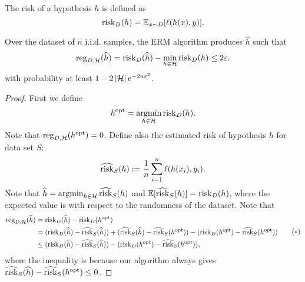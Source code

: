 \documentclass[a4paper]{article}
\begin{document}
\begin{defi}[Risk]
  The risk of a hypothesis $h$ is defined as
  \[
  \operatorname{risk}_D (h) = \mathbb{E}_{x \sim D} [ \ell(h(x), y) ].
  \]
\end{defi}

\begin{thm}
  Over the dataset of $n$ i.i.d. samples, the ERM algorithm
  produces $\hat{h}$ such that
  \[
  \operatorname{reg}_{D, \mathcal{H}} (\widehat{h})
  = \operatorname{risk}_D (\widehat{h}) - \min_{h \in \mathcal{H}}
  \operatorname{risk}_D (h)
  \leq 2 \varepsilon.
  \]
  with probability at least $1 - 2 \left\lvert \mathcal{H}\right\rvert e^{- 2
  n \varepsilon^2}$.
\end{thm}

\begin{proof}
{
  \newcommand{\hopt}{h^{\text{opt}}}
  First we define
  \[
    \hopt = \argmin_{h \in \hcal} \risk_D (h).
  \]
  Note that $\reg_{D, \hcal}(\hopt) = 0$. Define also the
  estimated risk of hypothesis $h$ for data set $S$:
  \[
  \widehat{\operatorname{risk}}_S (h) := \frac{1}{n} \sum_{i=1}^n \ell(h(x_i),
  y_i).
  \]
  Note that $\widehat{h} = \operatorname*{argmin}_{h \in \mathcal{H}}
  \widehat{\operatorname{risk}}_S (h)$ and $\mathbb{E}[\widehat{\operatorname{risk}}_S (h)] =
  \operatorname{risk}_D(h)$, where the expected value is with respect to
  the randomness of the dataset. Note that
  \begin{equation*}
    \begin{aligned}
      \reg_{D, \hcal} (\hat{h})
      &= \risk_D (\hat{h}) - \risk_D (\hopt) \\
      &= (\risk_D (\hat{h}) - \hat{\risk}_S (\hat{h}))
      + (\hat{\risk}_S (\hat{h}) - \hat{\risk}_S (\hopt))
      - (\risk_D (\hopt) - \hat{\risk}_S (\hopt))  \\
      &\leq (\risk_D (\hat{h}) - \hat{\risk}_S (\hat{h}))
      - (\risk_D (\hopt) - \hat{\risk}_S (\hopt)),
    \end{aligned}
    \tag{$*$}
    \label{reg}
  \end{equation*}
  where the inequality is because our algorithm
  always gives
  $\hat{\risk}_S (\hat{h}) - \hat{\risk}_S (\hopt) \leq 0$.

}
\end{proof}
\end{document}
